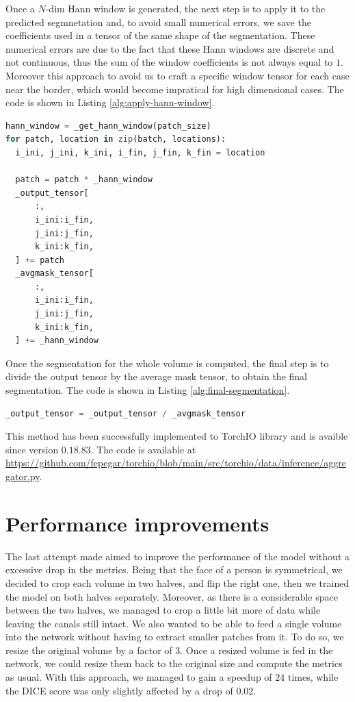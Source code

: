 Once a $N$-dim Hann window is generated, the next step is to apply it to the
predicted segmnetation and, to avoid small numerical errors, we save the
coefficients used in a tensor of the same shape of the segmentation. These
numerical errors are due to the fact that these Hann windows are discrete and
not continuous, thus the sum of the window coefficients is not always equal to
$1$. Moreover this approach to avoid us to craft a specific window tensor for each
case near the border, which would become impratical for high dimensional cases.
The code is shown in Listing \ref{alg:apply-hann-window}.
\begin{lstlisting}[language=Python, caption=Code to apply Hann window to a batch of patches given their locations, label=alg:apply-hann-window]
hann_window = _get_hann_window(patch_size)
for patch, location in zip(batch, locations):
  i_ini, j_ini, k_ini, i_fin, j_fin, k_fin = location

  patch = patch * _hann_window
  _output_tensor[
      :,
      i_ini:i_fin,
      j_ini:j_fin,
      k_ini:k_fin,
  ] += patch
  _avgmask_tensor[
      :,
      i_ini:i_fin,
      j_ini:j_fin,
      k_ini:k_fin,
  ] += _hann_window
\end{lstlisting}

Once the segmentation for the whole volume is computed, the final step is to
divide the output tensor by the average mask tensor, to obtain the final
segmentation. The code is shown in Listing \ref{alg:final-segmentation}.

\begin{lstlisting}[language=Python, caption=Code to compute the final segmentation, label=alg:final-segmentation]
_output_tensor = _output_tensor / _avgmask_tensor
\end{lstlisting}

This method has been successfully implemented to TorchIO library and is avaible
since version $0.18.83$. The code is available at
\url{https://github.com/fepegar/torchio/blob/main/src/torchio/data/inference/aggregator.py}.

\section{Performance improvements}
The last attempt made aimed to improve the performance of the model without a
excessive drop in the metrics. Being that the face of a person is symmetrical,
we decided to crop each volume in two halves, and flip the right one, then we
trained the model on both halves separately. Moreover, as there is a considerable
space between the two halves, we managed to crop a little bit more of data
while leaving the canals still intact. We also wanted to be able to feed a single volume
into the network without having to extract smaller patches from it. To do so, we
resize the original volume by a factor of $3$. Once a resized volume is fed in
the network, we could resize them back to the original size and compute the
metrics as usual. With this approach, we managed to gain a speedup of $24$ times,
while the DICE score was only slightly affected by a drop of $0.02$.


